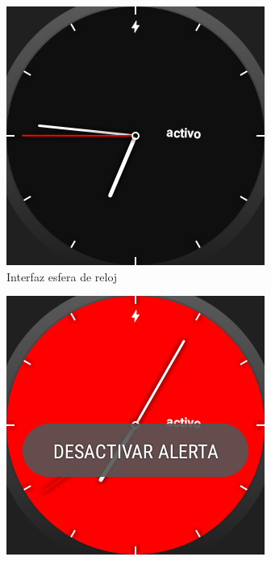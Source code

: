 \documentclass[11pt,a4paper,spanish,twocolumn]{article}
\begin{document}
\begin{figure}[!ht]
\begin{subfigure}[b]{0.48\columnwidth}
      \includegraphics[width=\linewidth]{img/appWatchface.png}
      \caption{\footnotesize Interfaz esfera de reloj}
      \label{fig:uiWatchface}
  \end{subfigure}
  \begin{subfigure}[b]{0.48\columnwidth}
      \centering
      \includegraphics[width=\linewidth]{img/appAlerta.png}

\end{subfigure}
\end{figure}
\end{document}
